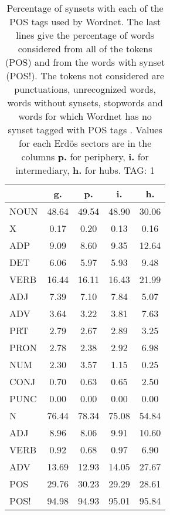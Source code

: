 \begin{table}[h!]
\begin{center}
\begin{tabular}{| l || c | c | c | c |}\hline
 & {\bf g.} & {\bf p.} & {\bf i.} & {\bf h.} \\\hline\hline
NOUN & 48.64  & 49.54  & 48.90  & 30.06 \\
X & 0.17  & 0.20  & 0.13  & 0.16 \\\hline
ADP & 9.09  & 8.60  & 9.35  & 12.64 \\
DET & 6.06  & 5.97  & 5.93  & 9.48 \\\hline
VERB & 16.44  & 16.11  & 16.43  & 21.99 \\\hline
ADJ & 7.39  & 7.10  & 7.84  & 5.07 \\
ADV & 3.64  & 3.22  & 3.81  & 7.63 \\\hline
PRT & 2.79  & 2.67  & 2.89  & 3.25 \\
PRON & 2.78  & 2.38  & 2.92  & 6.98 \\
NUM & 2.30  & 3.57  & 1.15  & 0.25 \\
CONJ & 0.70  & 0.63  & 0.65  & 2.50 \\
PUNC & 0.00  & 0.00  & 0.00  & 0.00 \\\hline\hline\hline
N & 76.44  & 78.34  & 75.08  & 54.84 \\\hline
ADJ & 8.96  & 8.06  & 9.91  & 10.60 \\\hline
VERB & 0.92  & 0.68  & 0.97  & 6.90 \\\hline
ADV & 13.69  & 12.93  & 14.05  & 27.67 \\\hline\hline
POS & 29.76  & 30.23  & 29.29  & 28.61 \\\hline
POS! & 94.98  & 94.93  & 95.01  & 95.84 \\\hline
\end{tabular}
\caption{Percentage of synsets with each of the POS tags used by Wordnet. The last lines give the percentage of words considered from all of the tokens (POS) and from the words with synset (POS!). The tokens not considered are punctuations, unrecognized words, words without synsets, stopwords and words for which Wordnet has no synset  tagged with POS tags . Values for each Erd\"os sectors are in the columns {{\bf p.}} for periphery, {{\bf i.}} for intermediary, {{\bf h.}} for hubs. TAG: 1}
\end{center}
\end{table}